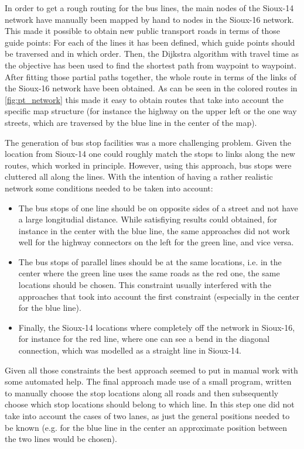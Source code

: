 In order to get a rough routing for the bus lines, the main nodes of the Sioux-14
network have manually been mapped by hand to nodes in the Sioux-16 network. This
made it possible to obtain new public transport roads in terms of those guide points:
For each of the lines it has been defined, which guide points should be traversed
and in which order. Then, the Dijkstra algorithm \citep{Dijkstra} with travel time as the objective
has been used to find the shortest path from waypoint to waypoint. After fitting
those partial paths together, the whole route in terms of the links of the Sioux-16
network have been obtained. As can be seen in the colored routes in \cref{fig:pt_network}
this made it easy to obtain routes that take into account the specific map structure
(for instance the highway on the upper left or the one way streets, which are
traversed by the blue line in the center of the map).

The generation of bus stop facilities was a more challenging problem. Given the
location from Sioux-14 one could roughly match the stops to links along the new
routes, which worked in principle. However, using this approach, bus stops were
cluttered all along the lines. With the intention of having a rather realistic
network some conditions needed to be taken into account:

\begin{itemize}
\item The bus stops of one line should be on opposite sides of a street and not
have a large longitudial distance. While satisfiying results could obtained, for
instance in the center with the blue line, the same approaches did not work well
for the highway connectors on the left for the green line, and vice versa.
\item The bus stops of parallel lines should be at the same locations, i.e. in
the center where the green line uses the same roads as the red one, the same
locations should be chosen. This constraint usually interfered with the approaches
that took into account the first constraint (especially in the center for the
blue line).
\item Finally, the Sioux-14 locations where completely off the network in Sioux-16,
for instance for the red line, where one can see a bend in the diagonal connection,
which was modelled as a straight line in Sioux-14.
\end{itemize}

Given all those constraints the best approach seemed to put in manual work with
some automated help. The final approach made use of a small program, written to
manually choose the stop locations along all roads and then subsequently choose
which stop locations should belong to which line. In this step one did not take
into account the cases of two lanes, as just the general positions needed to be
known (e.g. for the blue line in the center an approximate position between the
two lines would be chosen).

